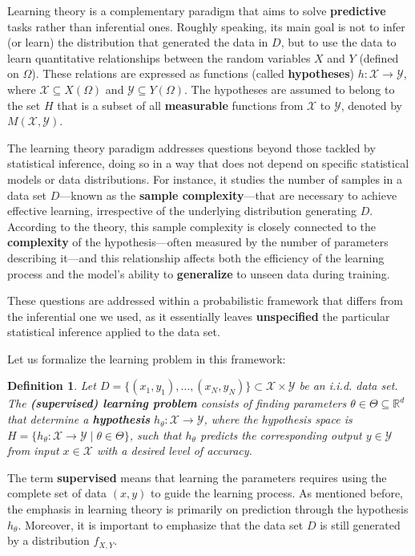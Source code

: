 \documentclass{report}
\newtheorem{definition}{Definition}[chapter]
\begin{document}
Learning theory is a complementary paradigm that aims to solve \textbf{predictive} tasks rather than inferential ones. Roughly speaking, its main goal is not to infer (or learn) the distribution that generated the data in $D$, but to use the data to learn quantitative relationships between the random variables $X$ and $Y$ (defined on $\Omega$). These relations are expressed as functions (called \textbf{hypotheses}) $h : \mathcal{X} \to \mathcal{Y}$, where $\mathcal{X} \subseteq X(\Omega)$ and $\mathcal{Y} \subseteq Y(\Omega)$. The hypotheses are assumed to belong to the set $H$ that is a subset of all \textbf{measurable} functions from $\mathcal{X}$ to $\mathcal{Y}$, denoted by $M(\mathcal{X}, \mathcal{Y})$.

The learning theory paradigm addresses questions beyond those tackled by statistical inference, doing so in a way that does not depend on specific statistical models or data distributions. For instance, it studies the number of samples in a data set $D$—known as the \textbf{sample complexity}—that are necessary to achieve effective learning, irrespective of the underlying distribution generating $D$. According to the theory, this sample complexity is closely connected to the \textbf{complexity} of the hypothesis—often measured by the number of parameters describing it—and this relationship affects both the efficiency of the learning process and the model's ability to \textbf{generalize} to unseen data during training.

These questions are addressed within a probabilistic framework that differs from the inferential one we used, as it essentially leaves \textbf{unspecified} the particular statistical inference applied to the data set.

Let us formalize the learning problem in this framework:

\begin{definition}
Let $D = \{(x_1,y_1), \dots, (x_N,y_N)\} \subset \mathcal{X} \times \mathcal{Y}$ be an i.i.d. data set. The \textbf{(supervised) learning problem} consists of finding parameters $\theta \in \Theta \subseteq \mathbb{R}^d$ that determine a \textbf{hypothesis} $h_\theta : \mathcal{X} \to \mathcal{Y}$, where the hypothesis space is $H = \{ h_\theta : \mathcal{X} \to \mathcal{Y} \mid \theta \in \Theta \}$, such that $h_\theta$ predicts the corresponding output $y \in \mathcal{Y}$ from input $x \in \mathcal{X}$ with a desired level of accuracy.
\end{definition}

The term \textbf{supervised} means that learning the parameters requires using the complete set of data $(x,y)$ to guide the learning process. As mentioned before, the emphasis in learning theory is primarily on prediction through the hypothesis $h_\theta$. Moreover, it is important to emphasize that the data set $D$ is still generated by a distribution $f_{X,Y}$.
\end{document}
